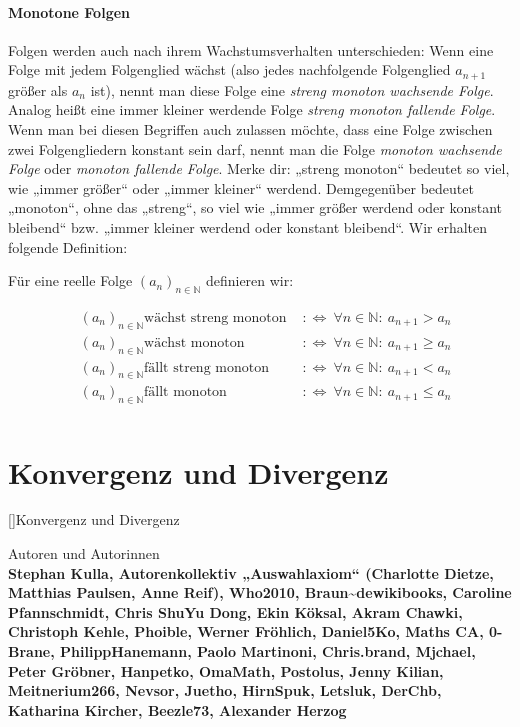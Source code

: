 \documentclass[fontsize=9pt,
               parskip=half-,
               DIV=14,
               listof=chapterentry,
               tocflat]{scrbook}
\newenvironment{authors}{\par\vspace*{\fill}\color{white}Autoren und
Autorinnen\\\bfseries}{\clearpage}
\begin{document}
\subsection{Monotone Folgen}

Folgen werden auch nach ihrem Wachstumsverhalten unterschieden: Wenn eine Folge mit jedem Folgenglied wächst (also jedes nachfolgende Folgenglied $a_{n+1}$ größer als $a_{n}$ ist), nennt man diese Folge eine \emph{streng monoton wachsende Folge}. Analog heißt eine immer kleiner werdende Folge \emph{streng monoton fallende Folge}. Wenn man bei diesen Begriffen auch zulassen möchte, dass eine Folge zwischen zwei Folgengliedern konstant sein darf, nennt man die Folge \emph{monoton wachsende Folge} oder \emph{monoton fallende Folge}. Merke dir: „streng monoton“ bedeutet so viel, wie „immer größer“ oder „immer kleiner“ werdend. Demgegenüber bedeutet „monoton“, ohne das „streng“, so viel wie „immer größer werdend oder konstant bleibend“ bzw. „immer kleiner werdend oder konstant bleibend“. Wir erhalten folgende Definition:

\begin{definition*}
Für eine reelle Folge $\left(a_{n}\right)_{n\in \mathbb {N} }$ definieren wir:

\begin{align*}
&\left(a_{n}\right)_{n\in \mathbb {N} }{\text{wächst streng monoton }}&:\iff \ \forall n\in \mathbb {N} :\ a_{n+1}>a_{n}\\&\left(a_{n}\right)_{n\in \mathbb {N} }{\text{wächst monoton }}&:\iff \ \forall n\in \mathbb {N} :\ a_{n+1}\geq a_{n}\\&\left(a_{n}\right)_{n\in \mathbb {N} }{\text{fällt streng monoton }}&:\iff \ \forall n\in \mathbb {N} :\ a_{n+1}<a_{n}\\&\left(a_{n}\right)_{n\in \mathbb {N} }{\text{fällt monoton }}&:\iff \ \forall n\in \mathbb {N} :\ a_{n+1}\leq a_{n}\\
\end{align*}

\end{definition*}

\part{Konvergenz und Divergenz}

[]{Konvergenz und Divergenz}\begin{authors}
Stephan Kulla, Autorenkollektiv „Auswahlaxiom“ (Charlotte Dietze, Matthias Paulsen, Anne Reif), Who2010, Braun\textasciitilde{}dewikibooks, Caroline Pfannschmidt, Chris ShuYu Dong, Ekin Köksal, Akram Chawki, Christoph Kehle, Phoible, Werner Fröhlich, Daniel5Ko, Maths CA, 0-Brane, PhilippHanemann, Paolo Martinoni, Chris.brand, Mjchael, Peter Gröbner, Hanpetko, OmaMath, Postolus, Jenny Kilian, Meitnerium266, Nevsor, Juetho, HirnSpuk, Letsluk, DerChb, Katharina Kircher, Beezle73, Alexander Herzog\end{authors}
\end{document}
